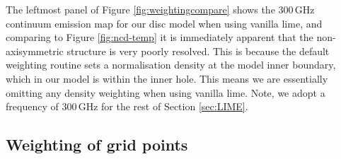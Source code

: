\documentclass[fleqn,usenatbib]{mnras}
\newcommand{\lime}{{\sc lime}}
\begin{document}
The leftmost panel of Figure \ref{fig:weightingcompare} shows the 300\,GHz continuum emission map for our disc model  when using vanilla \lime, and comparing to Figure \ref{fig:ncd-temp} it is immediately apparent that the non-axisymmetric structure is very poorly resolved. This is because the default weighting routine sets a normalisation density at the model inner boundary, which in our model is within the inner hole. This means we are essentially omitting any density weighting when using vanilla \lime. Note, we adopt a frequency of 300\,GHz for the rest of Section \ref{sec:LIME}.

\subsection{Weighting of grid points}
\label{sec:weighting}
\end{document}
